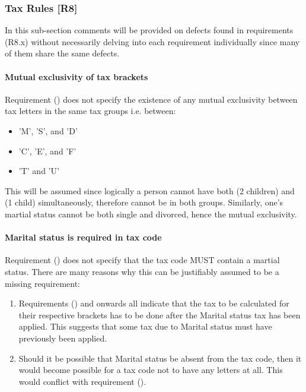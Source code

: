 \subsubsection{Tax Rules [R8]}

In this sub-section comments will be provided on defects found in requirements (R8.x) without necessarily delving into each requirement individually since many of them share the same defects.

\paragraph{Mutual exclusivity of tax brackets}
Requirement (\REightFour) does not specify the existence of any mutual exclusivity between tax letters in the same tax groups i.e. between: 
\begin{itemize}[noitemsep]
\item 'M', 'S', and 'D' 
\item 'C', 'E', and 'F'
\item 'T' and 'U'
\end{itemize}
This will be assumed since logically a person cannot have both (2 children) and (1 child) simultaneously, therefore cannot be in both groups. Similarly, one's martial status cannot be both single and divorced, hence the mutual exclusivity.  

\paragraph{Marital status is required in tax code}
Requirement (\REightFour) does not specify that the tax code MUST contain a martial status. There are many reasons why this can be justifiably assumed to be a missing requirement: 
\begin{enumerate}
	\item Requirements (\REightEight) and onwards all indicate that the tax to be calculated for their respective brackets has to be done after the Marital status tax has been applied. This suggests that some tax due to Marital status must have previously been applied. 
	\item Should it be possible that Marital status be absent from the tax code, then it would become possible for a tax code not to have any letters at all. This would conflict with requirement (\REightTwo). %
\end{enumerate}

